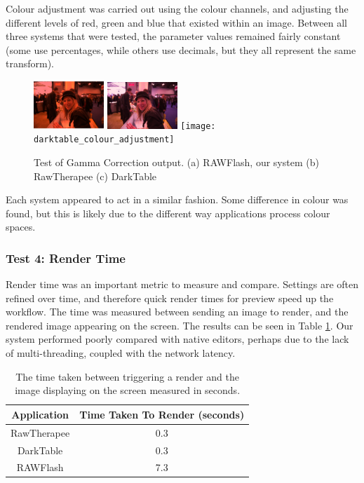 \documentclass[10pt,a4paper]{article}
\begin{document}
Colour adjustment was carried out using the colour channels, and adjusting the different levels of red, green and blue that existed within an image.
Between all three systems that were tested, the parameter values remained fairly constant (some use percentages, while others use decimals,
but they all represent the same transform).

\begin{figure}
    \centering
    \subfigure
    {
        \includegraphics[width=100px]{rawflash_colour_adjustment}
    }
    \subfigure
    {
        \includegraphics[width=100px]{rawtherapee_colour_adjustment}
    }
    \subfigure
    {
        \texttt{[image: darktable\_colour\_adjustment]}
    }
    \caption{
        Test of Gamma Correction output. 
        (a) RAWFlash, our system
        (b) RawTherapee
        (c) DarkTable
    }
    \label{colouradjustmentcomparison}
 \end{figure}
Each system appeared to act in a similar fashion. Some difference in colour was found, but this is likely due to the different way applications 
process colour spaces.

\subsubsection{Test 4: Render Time}
Render time was an important metric to measure and compare. Settings are often refined over time, and therefore quick render times for preview speed up the 
workflow. The time was measured between sending an image to render, and the rendered image appearing on the screen.
The results can be seen in Table \ref{RenderTimeTable}. Our system performed poorly compared with native editors, perhaps due to the lack of multi-threading,
coupled with the network latency.

\begin{table}
    \centering
    \begin{tabular}{| c | c |}
        \hline
        Application & Time Taken To Render (seconds)\\
        \hline
        RawTherapee & 0.3\\
        DarkTable & 0.3 \\
        RAWFlash & 7.3 \\
        \hline
    \end{tabular}
    \caption{The time taken between triggering a render and the image displaying on the screen measured in seconds.}
    \label{RenderTimeTable}
\end{table}
\end{document}
